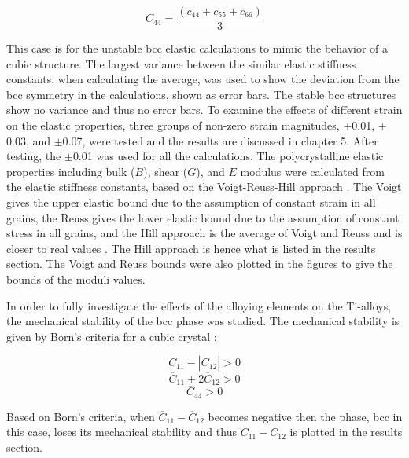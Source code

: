 \begin{equation}
\label{eq: averagec44}
\overline{C}_{44} = \frac{(c_{44} + c_{55} + c_{66})}{3}
\end{equation}

\noindent This case is for the unstable bcc elastic calculations to mimic the behavior of a cubic structure. The largest variance between the similar elastic stiffness constants, when calculating the average, was used to show the deviation from the bcc symmetry in the calculations, shown as error bars. The stable bcc structures show no variance and thus no error bars. To examine the effects of different strain on the elastic properties, three groups of non-zero strain magnitudes, $\pm$0.01, $\pm$0.03, and $\pm$0.07, were tested and the results are discussed in chapter 5. After testing, the $\pm$0.01 was used for all the calculations. The polycrystalline elastic properties including bulk ($B$), shear ($G$), and $E$ modulus were calculated from the elastic stiffness constants, based on the Voigt-Reuss-Hill approach \cite{Simmons1971b}. The Voigt gives the upper elastic bound due to the assumption of constant strain in all grains, the Reuss gives the lower elastic bound due to the assumption of constant stress in all grains, and the Hill approach is the average of Voigt and Reuss and is closer to real values \cite{Zuo1993,Chung1967}. The Hill approach is hence what is listed in the results section. The Voigt and Reuss bounds were also plotted in the figures to give the bounds of the moduli values.

In order to fully investigate the effects of the alloying elements on the Ti-alloys, the mechanical stability of the bcc phase was studied. The mechanical stability is given by Born's criteria for a cubic crystal  \cite{Born1998,Nye1985}:


\begin{equation}
\label{eq: born1}
\overline{C}_{11} -|\overline{C}_{12}| > 0
\end{equation}
\begin{equation}
\label{eq: born2}
\overline{C}_{11} + 2\overline{C}_{12} > 0
\end{equation}
\begin{equation}
\label{eq: born3}
\overline{C}_{44} > 0
\end{equation}

\noindent Based on Born's criteria, when $\overline{C}_{11} - \overline{C}_{12}$ becomes negative then the phase, bcc in this case, loses its mechanical stability and thus $\overline{C}_{11} - \overline{C}_{12}$ is plotted in the results section.

